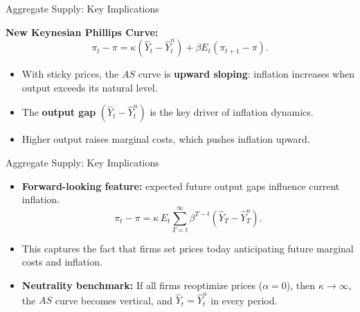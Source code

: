 \documentclass[11pt,aspectratio=169]{beamer}
\begin{document}
\begin{frame}[label=ASFeatures]{Aggregate Supply: Key Implications}
\small

\textbf{New Keynesian Phillips Curve:}
\[
\pi_t - \pi
=
\kappa(\hat{Y}_t - \hat{Y}_t^n)
+
\beta E_t(\pi_{t+1}-\pi).
\]

\begin{itemize}
    \item With sticky prices, the $AS$ curve is \textbf{upward sloping}: inflation increases when output exceeds its natural level.
    
    \item The \textbf{output gap} $(\hat{Y}_t - \hat{Y}_t^n)$ is the key driver of inflation dynamics.
    
    \item Higher output raises marginal costs, which pushes inflation upward.
\end{itemize}

\end{frame}

\begin{frame}[label=ASFeatures]{Aggregate Supply: Key Implications}
\small

\begin{itemize}
    \item \textbf{Forward-looking feature:} expected future output gaps influence current inflation.
    \[
    \pi_t - \pi
    = 
    \kappa\, E_t \sum_{T=t}^{\infty}
    \beta^{T-t}(\hat{Y}_T - \hat{Y}_T^n).
    \]
    
    \item This captures the fact that firms set prices today anticipating future marginal costs and inflation.
    
    \item \textbf{Neutrality benchmark:}  
    If all firms reoptimize prices ($\alpha = 0$), then  
    $\kappa \to \infty$, the $AS$ curve becomes vertical, and  
    $\hat{Y}_t = \hat{Y}_t^n$ in every period.
\end{itemize}

\end{frame}
\end{document}

